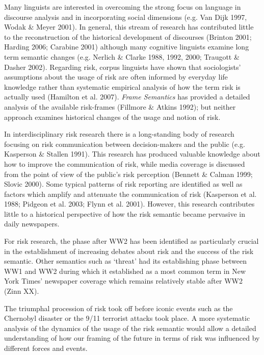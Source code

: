 \documentclass{report}
\begin{document}
Many linguists are interested in overcoming the strong focus on language in discourse analysis and in incorporating social dimensions (e.g. Van Dijk 1997, Wodak \& Meyer 2001). In general, this stream of research has contributed little to the reconstruction of the historical development of discourses (Brinton 2001; Harding 2006; Carabine 2001) although many cognitive linguists examine long term semantic changes (e.g. Nerlich \& Clarke 1988, 1992, 2000; Traugott \& Dasher 2002). Regarding risk, corpus linguists have shown that sociologists' assumptions about the usage of risk are often informed by everyday life knowledge rather than systematic empirical analysis of how the term risk is actually used (Hamilton et al. 2007). \emph{Frame Semantics} has provided a detailed analysis of the available risk-frames (Fillmore \& Atkins 1992); but neither approach examines historical changes of the usage and notion of risk.

In interdisciplinary risk research there is a long-standing body of research focusing on risk communication between decision-makers and the public (e.g. Kasperson \& Stallen 1991). This research has produced valuable knowledge about how to improve the communication of risk, while media coverage is discussed from the point of view of the public's risk perception (Bennett \& Calman 1999; Slovic 2000). Some typical patterns of risk reporting are identified as well as factors which amplify and attenuate the communication of risk (Kasperson et al. 1988; Pidgeon et al. 2003; Flynn et al. 2001). However, this research contributes little to a historical perspective of how the risk semantic became pervasive in daily newspapers. 


For risk research, the phase after WW2 has been identified as particularly crucial in the establishment of increasing debates about risk and the success of the risk semantic. Other semantics such as `threat' had its establishing phase between WW1 and WW2 during which it established as a most common term in New York Times' newspaper coverage which remains relatively stable after WW2 (Zinn XX).

The triumphal procession of risk took off before iconic events such as the Chernobyl disaster or the 9\slash 11 terrorist attacks took place. A more systematic analysis of the dynamics of the usage of the risk semantic would allow a detailed understanding of how our framing of the future in terms of risk was influenced by different forces and events. 
\end{document}
